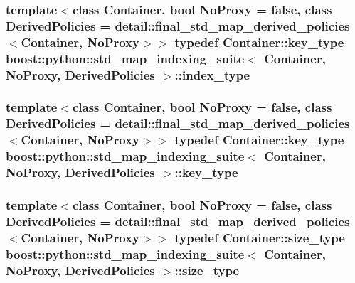 \subsubsection[{\texorpdfstring{index\+\_\+type}{index_type}}]{\setlength{\rightskip}{0pt plus 5cm}template$<$class Container, bool No\+Proxy = false, class Derived\+Policies = detail\+::final\+\_\+std\+\_\+map\+\_\+derived\+\_\+policies$<$\+Container, No\+Proxy$>$$>$ typedef Container\+::key\+\_\+type {\bf boost\+::python\+::std\+\_\+map\+\_\+indexing\+\_\+suite}$<$ Container, No\+Proxy, Derived\+Policies $>$\+::{\bf index\+\_\+type}}\hypertarget{classboost_1_1python_1_1std__map__indexing__suite_a4b2ac75883fba93dbca6d9e83197c842}{}\label{classboost_1_1python_1_1std__map__indexing__suite_a4b2ac75883fba93dbca6d9e83197c842}
\subsubsection[{\texorpdfstring{key\+\_\+type}{key_type}}]{\setlength{\rightskip}{0pt plus 5cm}template$<$class Container, bool No\+Proxy = false, class Derived\+Policies = detail\+::final\+\_\+std\+\_\+map\+\_\+derived\+\_\+policies$<$\+Container, No\+Proxy$>$$>$ typedef Container\+::key\+\_\+type {\bf boost\+::python\+::std\+\_\+map\+\_\+indexing\+\_\+suite}$<$ Container, No\+Proxy, Derived\+Policies $>$\+::{\bf key\+\_\+type}}\hypertarget{classboost_1_1python_1_1std__map__indexing__suite_a4e2daeb60a58d6ce9964e0ea27680009}{}\label{classboost_1_1python_1_1std__map__indexing__suite_a4e2daeb60a58d6ce9964e0ea27680009}
\subsubsection[{\texorpdfstring{size\+\_\+type}{size_type}}]{\setlength{\rightskip}{0pt plus 5cm}template$<$class Container, bool No\+Proxy = false, class Derived\+Policies = detail\+::final\+\_\+std\+\_\+map\+\_\+derived\+\_\+policies$<$\+Container, No\+Proxy$>$$>$ typedef Container\+::size\+\_\+type {\bf boost\+::python\+::std\+\_\+map\+\_\+indexing\+\_\+suite}$<$ Container, No\+Proxy, Derived\+Policies $>$\+::{\bf size\+\_\+type}}\hypertarget{classboost_1_1python_1_1std__map__indexing__suite_ad1c24ad53b2e27b061f75591c74296c2}{}\label{classboost_1_1python_1_1std__map__indexing__suite_ad1c24ad53b2e27b061f75591c74296c2}
